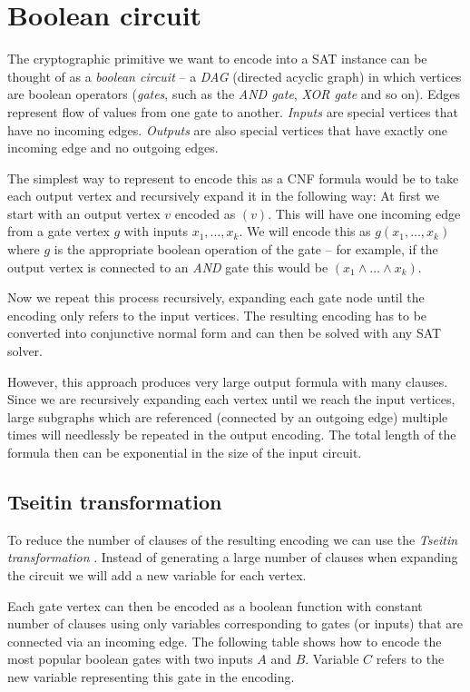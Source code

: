 
\section{Boolean circuit}
The cryptographic primitive we want to encode into a SAT instance can be thought of as a \emph{boolean circuit} -- a \emph{DAG} (directed acyclic graph) in which vertices are boolean operators (\emph{gates}, such as the \emph{AND gate}, \emph{XOR gate} and so on).
Edges represent flow of values from one gate to another.
\emph{Inputs} are special vertices that have no incoming edges.
\emph{Outputs} are also special vertices that have exactly one incoming edge and no outgoing edges.

The simplest way to represent to encode this as a CNF formula would be to take each output vertex and recursively expand it in the following way:
At first we start with an output vertex $v$ encoded as $(v)$.
This will have one incoming edge from a gate vertex $g$ with inputs $x_1, \dots, x_k$.
We will encode this as $g(x_1, \dots, x_k)$ where $g$ is the appropriate boolean operation of the gate -- for example, if the output vertex is connected to an \emph{AND} gate this would be $(x_1 \land \dots \land x_k)$.

Now we repeat this process recursively, expanding each gate node until the encoding only refers to the input vertices.
The resulting encoding has to be converted into conjunctive normal form and can then be solved with any SAT solver.

However, this approach produces very large output formula with many clauses.
Since we are recursively expanding each vertex until we reach the input vertices, large subgraphs which are referenced (connected by an outgoing edge) multiple times will needlessly be repeated in the output encoding.
The total length of the formula then can be exponential in the size of the input circuit.

\subsection{Tseitin transformation}
To reduce the number of clauses of the resulting encoding we can use the \emph{Tseitin transformation} \citep{tseitin1983complexity}.
Instead of generating a large number of clauses when expanding the circuit we will add a new variable for each vertex.

Each gate vertex can then be encoded as a boolean function with constant number of clauses using only variables corresponding to gates (or inputs) that are connected via an incoming edge.
The following table shows how to encode the most popular boolean gates with two inputs $A$ and $B$.
Variable $C$ refers to the new variable representing this gate in the encoding.

